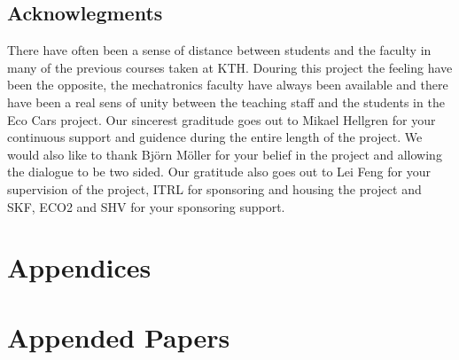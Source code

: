 \documentclass[a4paper, 12pt]{report}
\begin{document}
\chapter*{Acknowlegments}
There have often been a sense of distance between students and the faculty in
many of the previous courses taken at KTH. Douring this project the feeling have
been the opposite, the mechatronics faculty have always been available and there
have been a real sens of unity between the teaching staff and the students in
the Eco Cars project. Our sincerest graditude goes out to Mikael Hellgren for
your continuous support and guidence during the entire length of the project. We
would also like to thank Björn Möller for your belief in the project and allowing
the dialogue to be two sided. Our gratitude also goes out to Lei Feng for your
supervision of the project, ITRL for sponsoring and housing the project and SKF,
ECO2 and SHV for your sponsoring support. 


\appendix
\part{Appendices}



\part{Appended Papers}
\end{document}
